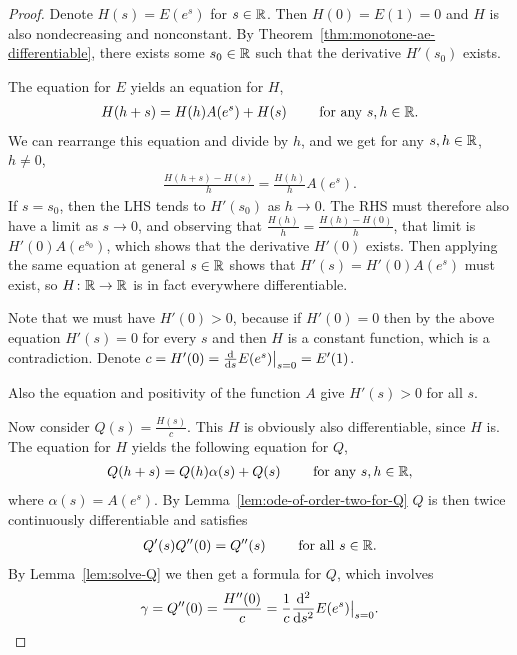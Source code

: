 \begin{proof}
  Denote $H(s) = E(e^s)$ for $s \in \mathbb{R}$. Then $H(0) = E(1) = 0$ and
  $H$ is also nondecreasing and nonconstant.
  By Theorem~\ref{thm:monotone-ae-differentiable}, there
  exists some $s_0 \in \mathbb{R}$ such that the derivative $H'(s_0)$ exists.

  The equation for $E$ yields an equation for $H$,
  \begin{align*}
  H(h+s) = H(h) A(e^{s}) + H(s) \qquad \text{ for any } s, h \in \mathbb{R}.
  \end{align*}
  We can rearrange this equation and divide by $h$,
  and we get for any $s, h \in \mathbb{R}$, $h \ne 0$,
  \begin{align*}
  \frac{H(h+s) - H(s)}{h} = \frac{H(h)}{h} A(e^{s}) .
  \end{align*}
  If $s = s_0$, then the LHS tends to $H'(s_0)$ as $h \to 0$.
  The RHS must therefore also have a limit as $s \to 0$, and
  observing that $\frac{H(h)}{h} = \frac{H(h) - H(0)}{h}$,
  that limit is $H'(0) A(e^{s_0})$, which shows that the derivative $H'(0)$ exists.
  Then applying the same equation at general $s \in \mathbb{R}$ shows that
  $H'(s) = H'(0) A(e^{s})$ must exist, so $H \colon \mathbb{R} \to \mathbb{R}$ is
  in fact everywhere differentiable.

  Note that we must have $H'(0) > 0$, because if $H'(0) = 0$
  then by the above equation $H'(s) = 0$ for every $s$ and then
  $H$ is a constant function, which is a contradiction.
  Denote $c = H'(0) = \frac{\mathrm{d}}{\mathrm{d} s} E(e^s) \big|_{s=0} = E'(1)$.

  Also the equation and positivity of the function $A$ give $H'(s)>0$
  for all $s$. %

  Now consider $Q(s) = \frac{H(s)}{c}$. This $H$ is
  obviously also differentiable, since $H$ is. The equation
  for $H$ yields the following equation for $Q$,
  \begin{align*}
    Q(h+s) = Q(h) \alpha(s) + Q(s) \qquad \text{ for any } s,h \in \mathbb{R} ,
  \end{align*}
  where $\alpha(s) = A(e^{s})$.
  By Lemma~\ref{lem:ode-of-order-two-for-Q} $Q$ is then twice
  continuously differentiable and satisfies
  \begin{align}
  Q'(s) Q'' (0) = Q'' (s) \qquad \text{ for all } s \in \mathbb{R} .
  \end{align}
  By Lemma~\ref{lem:solve-Q} we then get
  a formula for $Q$, which involves
  \begin{align*}
  \gamma = Q''(0) = \frac{H''(0)}{c}
    = \frac{1}{c} \frac{\mathrm{d}^2}{\mathrm{d} {s}^2} E(e^s) \big|_{s = 0} .
  \end{align*}


\end{proof}

